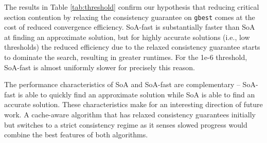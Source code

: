 The results in Table \ref{tab:threshold} confirm our hypothesis that
reducing critical section contention by relaxing the consistency
guarantee on \texttt{gbest} comes at the cost of reduced convergence efficiency. SoA-fast is
substantially faster than SoA at finding an approximate solution, but for highly
accurate solutions (i.e., low thresholds) the reduced efficiency due to the
relaxed consistency guarantee starts to dominate the search, resulting in
greater runtimes. For the 1e-6 threshold, SoA-fast is almost
uniformly slower for precisely this reason.

The performance characteristics of SoA and SoA-fast are complementary --
SoA-fast is able to quickly find an approximate solution while SoA is able to
find an accurate solution. These characteristics make for an interesting
direction of  future work. A cache-aware algorithm that has relaxed
consistency guarantees initially but switches to a strict consistency regime as
it senses slowed progress would combine the best features of both algorithms.


